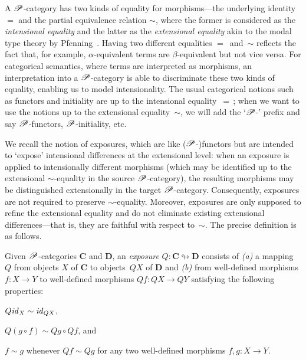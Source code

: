 \documentclass[a4paper,UKenglish,numberwithinsect,cleveref,thm-restate]{lipics-v2021}
\numberwithin{equation}{section}
\theoremstyle{plain}
\begin{document}
A $\mathscr{P}$-category has two kinds of equality for morphisms---the underlying identity $=$ and the partial equivalence relation $\sim$, where the former is considered as the \emph{intensional equality} and the latter as the \emph{extensional equality} akin to the modal type theory by Pfenning~\cite{Pfenning2002a}.
Having two different equalities $=$~and~$\sim$ reflects the fact that, for example, $\alpha$-equivalent terms are $\beta$-equivalent but not vice versa.
For categorical semantics, where terms are interpreted as morphisms, an interpretation into a $\mathscr{P}$-category is able to discriminate these two kinds of equality, enabling us to model intensionality.
The usual categorical notions such as functors and initiality are up to the intensional equality~$=$\,; when we want to use the notions up to the extensional equality~$\sim$, we will add the `$\mathscr{P}$-' prefix and say $\mathscr{P}$-functors, $\mathscr{P}$-initiality, etc.

We recall the notion of exposures, which are like ($\mathscr{P}$-)functors but are intended to `expose' intensional differences at the extensional level: when an exposure is applied to intensionally different morphisms (which may be identified up to the extensional $\sim$-equality in the source $\mathscr{P}$-category), the resulting morphisms may be distinguished extensionally in the target $\mathscr{P}$-category.
Consequently, exposures are not required to preserve $\sim$-equality.
Moreover, exposures are only supposed to refine the extensional equality and do not eliminate existing extensional differences---that is, they are faithful with respect to~$\sim$.
The precise definition is as follows.

\begin{definition}
  Given $\mathscr{P}$-categories $\mathbf{C}$ and $\mathbf{D}$, an \emph{exposure} $Q\colon \mathbf{C} \looparrowright \mathbf{D}$ consists of \emph{(a)} a mapping $Q$ from objects $X$ of\/ $\mathbf{C}$ to objects~$QX$ of\/ $\mathbf{D}$ and \emph{(b)} from well-defined morphisms $f\colon X \to Y$ to well-defined morphisms $Qf\colon QX \to QY$ satisfying the following properties:
  \begin{romanenumerate}
    \item $Q\mathit{id}_X \sim \mathit{id}_{QX}$,
    \item $Q(g \circ f) \sim Qg \circ Qf$, and
    \item $f \sim g$ whenever $Qf \sim Qg$ for any two well-defined morphisms $f, g\colon X \to Y$. 
  \end{romanenumerate}
\end{definition}
\end{document}
